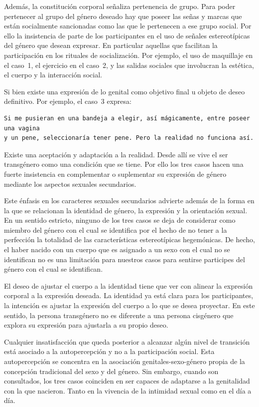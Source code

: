 Además, la constitución corporal señaliza pertenencia de grupo. Para poder
pertenecer al grupo del género deseado hay que poseer las señas y marcas que
están socialmente sancionadas como las que le pertenecen a ese grupo social. Por
ello la insistencia de parte de los participantes en el uso de señales
estereotípicas del género que desean expresar. En particular aquellas que
facilitan la participación en los rituales de socialización. Por ejemplo, el uso
de maquillaje en el caso~1, el ejercicio en el caso~2, y las salidas sociales
que involucran la estética, el cuerpo y la interacción social.

Si bien existe una expresión de lo genital como objetivo final u objeto de deseo
definitivo. Por ejemplo, el caso~3 expresa:

\begin{verbatim}
Si me pusieran en una bandeja a elegir, así mágicamente, entre poseer una vagina
y un pene, seleccionaría tener pene. Pero la realidad no funciona así.
\end{verbatim}

Existe una aceptación y adaptación a la realidad. Desde allí se vive el ser
transgénero como una condición que se tiene. Por ello los tres casos hacen una
fuerte insistencia en complementar o suplementar su expresión de género mediante
los aspectos sexuales secundarios.

Este énfasis en los caracteres sexuales secundarios advierte además de la forma
en la que se relacionan la identidad de género, la expresión y la orientación
sexual. En un sentido estricto, ninguno de los tres casos se deja de considerar
como miembro del género con el cual se identifica por el hecho de no tener a la
perfección la totalidad de las características estereotípicas hegemónicas. De
hecho, el haber nacido con un cuerpo que es asignado a un sexo con el cual no se
identifican no es una limitación para nuestros casos para sentirse participes
del género con el cual se identifican.

El deseo de ajustar el cuerpo a la identidad tiene que ver con alinear la
expresión corporal a la expresión deseada. La identidad ya está clara para los
participantes, la intención es ajustar la expresión del cuerpo a lo que se desea
proyectar. En este sentido, la persona transgénero no es diferente a una persona
cisgénero que explora su expresión para ajustarla a su propio deseo.

 Cualquier insatisfacción que queda posterior a alcanzar algún nivel de
 transición está asociado a la autopercepción y no a la participación social.
 Esta autopercepción se concentra en la asociación genitales-sexo-género propia
 de la concepción tradicional del sexo y del género. Sin embargo, cuando son
 consultados, los tres casos coinciden en ser capaces de adaptarse a la
 genitalidad con la que nacieron. Tanto en la vivencia de la intimidad sexual
 como en el día a día.

